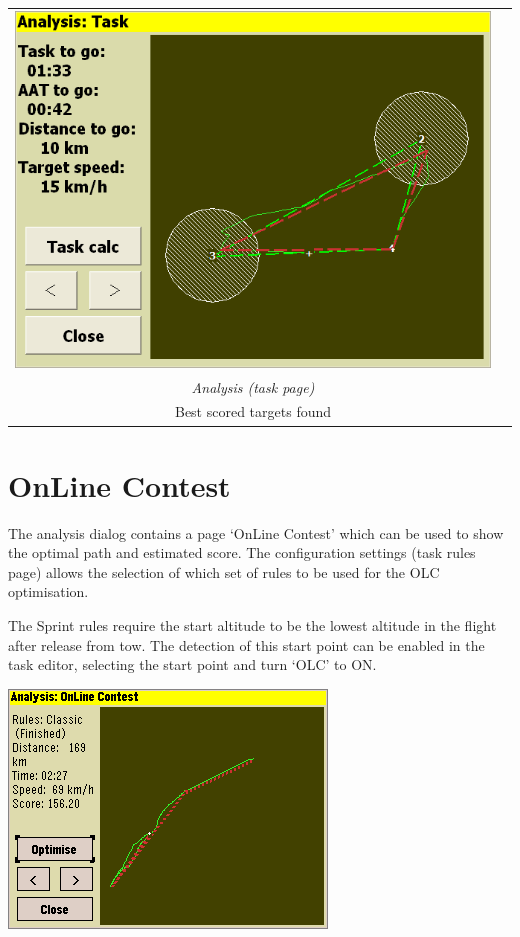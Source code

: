 \documentclass[a4paper,12pt]{refrep}
\begin{document}
\begin{maxipage}
\begin{center}
\begin{longtable}{|c|c|}
 \midrule

\includegraphics[angle=0,width=0.45\linewidth,keepaspectratio='true']{figures/faat12.png} &  \\
{\em Analysis (task page)} &  \\
Best scored targets found &  \\
\bottomrule
\end{longtable}
\end{center}
\end{maxipage}

\section{OnLine Contest}

  The analysis dialog contains a page `OnLine Contest' which can be
  used to show the optimal path and estimated score.  The
  configuration settings  (task rules page) allows the
  selection of which set of rules to be used for the OLC optimisation.

  The Sprint rules require the start altitude to be the lowest
  altitude in the flight after release from tow.  The detection
  of this start point can be  enabled in the task editor,
  selecting the start point and turn `OLC' to ON.

\begin{center}
\includegraphics[angle=0,width=\linewidth,keepaspectratio='true']{figures/shot-olc.png}
\end{center}
\end{document}
